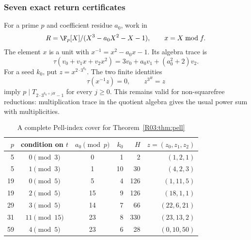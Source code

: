 \documentclass[11pt,a4paper]{article}
\theoremstyle{definition}\newtheorem{definition}[theorem]{Definition}
\theoremstyle{remark}\newtheorem{remark}[theorem]{Remark}
\begin{document}
\subsubsection{Seven exact return certificates}

For a prime $p$ and coefficient residue $a_0$, work in
\[
 R=\F_p[X]/(X^3-a_0X^2-X-1),\qquad x=X\bmod f.
\]
The element $x$ is a unit with $x^{-1}=x^2-a_0x-1$. Its algebra trace is
\begin{equation}\label{R03:eq:trace-ring}
 \tau(v_0+v_1x+v_2x^2)=3v_0+a_0v_1+(a_0^2+2)v_2.
\end{equation}
For a seed $k_0$, put $z=x^{2\cdot3^{k_0}}$. The two finite identities
\begin{equation}\label{R03:eq:certificate}
 \tau(x^{-1}z)=0,\qquad z^{3^H}=z
\end{equation}
imply
$p\mid T_{2\cdot3^{k_0+jH}-1}$ for every $j\ge0$.
This remains valid for non-squarefree reductions: multiplication
trace in the quotient algebra gives the usual power sum with
multiplicities.

\begin{table}[ht]
\centering
\caption{A complete Pell-index cover for Theorem~\ref{R03:thm:pell}}
\label{R03:tab:pell}
\begin{tabular}{rccrrr}
\toprule
$p$ & condition on $t$ & $a_0\pmod p$ & $k_0$ & $H$ & $z=(z_0,z_1,z_2)$\\
\midrule
5  & $0\pmod3$   & 0  & 1  & 2   & $(1,2,1)$\\
5  & $1\pmod3$   & 1  & 10 & 30  & $(4,2,3)$\\
19 & $0\pmod5$   & 5  & 4  & 126 & $(1,11,5)$\\
19 & $2\pmod5$   & 15 & 9  & 126 & $(18,1,1)$\\
29 & $3\pmod5$   & 14 & 7  & 66  & $(22,6,21)$\\
31 & $11\pmod{15}$ & 23 & 8 & 330 & $(23,13,2)$\\
59 & $4\pmod5$   & 23 & 6  & 28  & $(0,10,50)$\\
\bottomrule
\end{tabular}
\end{table}
\end{document}
